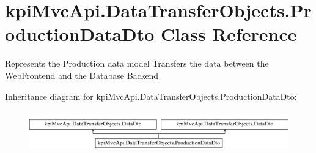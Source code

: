 \hypertarget{classkpi_mvc_api_1_1_data_transfer_objects_1_1_production_data_dto}{}\section{kpi\+Mvc\+Api.\+Data\+Transfer\+Objects.\+Production\+Data\+Dto Class Reference}
\label{classkpi_mvc_api_1_1_data_transfer_objects_1_1_production_data_dto}


Represents the Production data model Transfers the data between the Web\+Frontend and the Database Backend  


Inheritance diagram for kpi\+Mvc\+Api.\+Data\+Transfer\+Objects.\+Production\+Data\+Dto\+:\begin{figure}[H]
\begin{center}
\leavevmode
\includegraphics[height=1.800643cm]{classkpi_mvc_api_1_1_data_transfer_objects_1_1_production_data_dto}
\end{center}
\end{figure}

